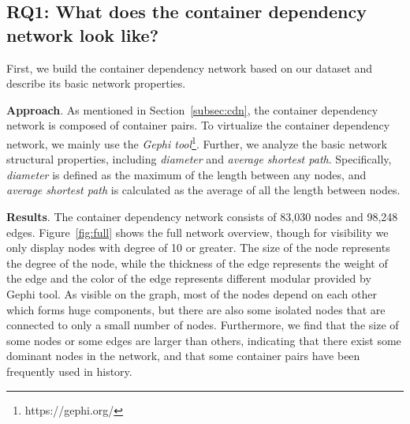 \documentclass[sigconf]{acmart}
\begin{document}
\subsection{RQ1: What does the container dependency network look like?}
First, we build the container dependency network based on our dataset and describe its basic network properties.

\noindent\textbf{Approach}. 
As mentioned in Section~\ref{subsec:cdn}, the container dependency network is composed of container pairs.  
To virtualize the container dependency network, we mainly use the \emph{Gephi tool}\footnote{https://gephi.org/}. 
Further, we analyze the basic network structural properties, including  
\emph{diameter} and \emph{average shortest path}. 
 Specifically, \emph{diameter} is defined as the maximum of the length between any nodes, and \emph{average shortest path} is calculated as the average of all the length between nodes. 


\smallskip
\noindent\textbf{Results}. 
The container dependency network consists of 83,030 nodes and 98,248 edges. Figure~\ref{fig:full} shows the full network overview, though for visibility we only display nodes with degree of 10 or greater.
The size of the node represents the degree of the node, while the thickness of the edge represents the weight of the edge and the color of the edge represents different modular provided by Gephi tool. 
As visible on the graph, most of the nodes depend on each other which forms huge components, but there are also some isolated nodes that are connected to only a small number of nodes. 
Furthermore, we find that the size of some nodes or some edges are larger than others, indicating that there exist some dominant nodes  in the network, and that some container pairs have been frequently used in history. 
\end{document}
